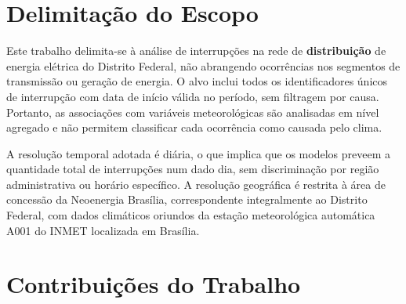 \section{Delimitação do Escopo}\label{sec:delimitacao}

Este trabalho delimita-se à análise de interrupções na rede de \textbf{distribuição} de energia elétrica do Distrito Federal, não abrangendo ocorrências nos segmentos de transmissão ou geração de energia. O alvo inclui todos os identificadores únicos de interrupção com data de início válida no período, sem filtragem por causa. Portanto, as associações com variáveis meteorológicas são analisadas em nível agregado e não permitem classificar cada ocorrência como causada pelo clima.

A resolução temporal adotada é diária, o que implica que os modelos preveem a quantidade total de interrupções num dado dia, sem discriminação por região administrativa ou horário específico. A resolução geográfica é restrita à área de concessão da Neoenergia Brasília, correspondente integralmente ao Distrito Federal, com dados climáticos oriundos da estação meteorológica automática A001 do INMET localizada em Brasília.

\section{Contribuições do Trabalho}\label{sec:contribuicoes}

